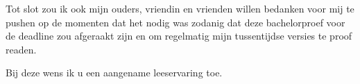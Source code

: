 Tot slot zou ik ook mijn ouders, vriendin en vrienden willen bedanken voor mij te pushen op de momenten dat het nodig was zodanig dat deze bachelorproef voor de deadline zou afgeraakt zijn en om regelmatig mijn tussentijdse versies te proof readen.

Bij deze wens ik u een aangename leeservaring toe.

